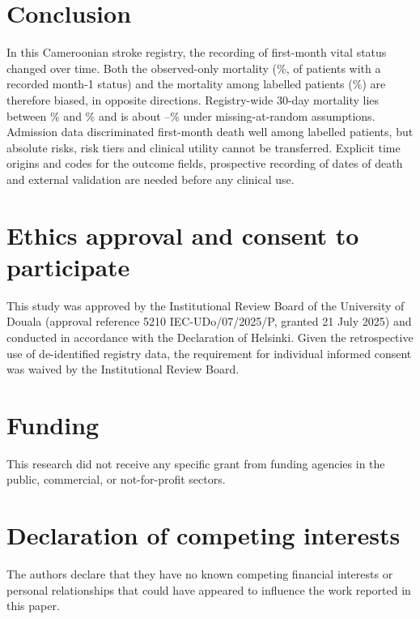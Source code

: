 \documentclass[preprint,10pt]{elsarticle}
\begin{document}
\section{Conclusion}
In this Cameroonian stroke registry, the recording of first-month vital status changed over time. Both the observed-only mortality (\MortObs\%, \ObsE{} of \ObsN{} patients with a recorded month-1 status) and the mortality among labelled patients (\Mortlab\%) are therefore biased, in opposite directions. Registry-wide 30-day mortality lies between \BoundLo\% and \BoundHi\% and is about \Mortipw--\DeltaMARearly\% under missing-at-random assumptions. Admission data discriminated first-month death well among labelled patients, but absolute risks, risk tiers and clinical utility cannot be transferred. Explicit time origins and codes for the outcome fields, prospective recording of dates of death and external validation are needed before any clinical use.

\section*{Ethics approval and consent to participate}
This study was approved by the Institutional Review Board of the University of Douala (approval reference 5210 IEC-UDo/07/2025/P, granted 21 July 2025) and conducted in accordance with the Declaration of Helsinki. Given the retrospective use of de-identified registry data, the requirement for individual informed consent was waived by the Institutional Review Board.

\section*{Funding}
This research did not receive any specific grant from funding agencies in the public, commercial, or not-for-profit sectors.

\section*{Declaration of competing interests}
The authors declare that they have no known competing financial interests or personal relationships that could have appeared to influence the work reported in this paper.
\end{document}
